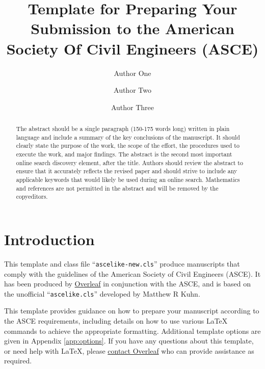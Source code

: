 \documentclass[Journal,letterpaper]{ascelike-new}
\begin{document}
\title{Template for Preparing Your Submission to the American Society Of Civil Engineers (ASCE)}

\author[1]{Author One}
\author[2]{Author Two}
\author[3]{Author Three}


\maketitle

\begin{abstract}
The abstract should be a single paragraph (150-175 words long) written in plain language and include a summary of the key conclusions of the manuscript. It should clearly state the purpose of the work, the scope of the effort, the procedures used to execute the work, and major findings. The abstract is the second most important online search discovery element, after the title. Authors should review the abstract to ensure that it accurately reflects the revised paper and should strive to include any applicable keywords that would likely be used during an online search. Mathematics and references are not permitted in the abstract and will be removed by the copyeditors.
\end{abstract}

\section{Introduction}
This template and class file ``\texttt{ascelike-new.cls}'' produce manuscripts that comply with the guidelines of the American Society of Civil Engineers (ASCE). It has been produced by \href{https://www.overleaf.com}{Overleaf} in conjunction with the ASCE, and is based on the unofficial ``\texttt{ascelike.cls}'' developed by Matthew R Kuhn.

This template provides guidance on how to prepare your manuscript according to the ASCE requirements, including details on how to use various LaTeX commands to achieve the appropriate formatting. Additional template options are given in Appendix \ref{app:options}. If you have any questions about this template, or need help with LaTeX, please \href{https://www.overleaf.com/contact}{contact Overleaf} who can provide assistance as required.
\end{document}

